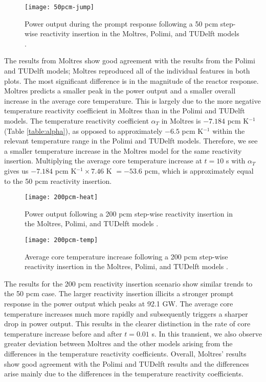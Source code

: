 \begin{figure}[htbp!]
    \centering
    \texttt{[image: 50pcm-jump]}
    \caption{Power output during the prompt response following
    a 50 pcm step-wise reactivity insertion in the Moltres, Polimi, and
    TUDelft models \cite{fiorina_modelling_2014}.}
    \label{fig:50pcmjump}
\end{figure}

The results from Moltres show good agreement with the results from the Polimi
and TUDelft models; Moltres reproduced all of the individual features in both
plots. The most significant difference is in the magnitude of the reactor
response. Moltres predicts a smaller peak in the power output and a smaller
overall increase in the average core temperature. This is largely due to the
more negative temperature reactivity coefficient in Moltres than in the Polimi
and TUDelft models. The temperature reactivity coefficient $\alpha_T$ in
Moltres is $-7.184$ pcm K$^{-1}$ (Table \ref{table:alpha}), as opposed to
approximately $-6.5$ pcm K$^{-1}$ within the relevant temperature range in the
Polimi and TUDelft models. Therefore, we see a smaller temperature increase in
the Moltres model for the same reactivity insertion. Multiplying the average
core temperature increase at $t=10$ s with $\alpha_T$ gives us $-7.184$ pcm
K$^{-1} \times 7.46$ K $= -53.6$ pcm, which is approximately equal to the 50
pcm reactivity insertion.

\begin{figure}[htbp!]
    \centering
    \texttt{[image: 200pcm-heat]}
    \caption{Power output following
    a 200 pcm step-wise reactivity insertion in the Moltres, Polimi, and
    TUDelft models \cite{fiorina_modelling_2014}.}
    \label{fig:200pcmheat}
%
    \centering
    \texttt{[image: 200pcm-temp]}
    \caption{Average core temperature increase following
    a 200 pcm step-wise reactivity insertion in the Moltres, Polimi, and
    TUDelft models \cite{fiorina_modelling_2014}.}
    \label{fig:200pcmtemp}
\end{figure}

The results for the 200 pcm reactivity insertion scenario show similar trends
to the 50 pcm case. The larger reactivity insertion illicits a stronger
prompt response in the power output which peaks at 92.1 GW. The average core
temperature increases much more rapidly and subsequently triggers a sharper
drop in power output. This results in the clearer distinction in the rate of
core temperature increase before and after $t=0.01$ s. In this transient, we
also observe greater deviation between Moltres and the other models arising
from the differences in the temperature reactivity coefficients. Overall,
Moltres' results show good agreement with the Polimi and TUDelft results and
the differences arise mainly due to the differences in the temperature
reactivity coefficients.


